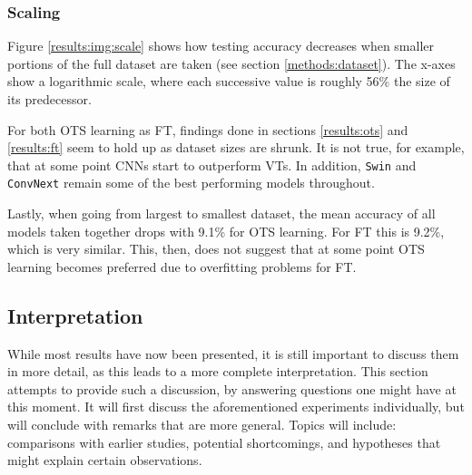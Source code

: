 \subsubsection{Scaling}

\begin{figure*}[tb]
    \centering
    \def\svgwidth{\textwidth}
    
    \caption{Testing accuracy as datasets gradually become smaller. The x-axes show a logarithmic scale, with the smallest value being roughly 10\% the size of largest one. Observations done in sections \ref{results:ots} and \ref{results:ft} appear to hold up well as the training set is shrunk.}
    \label{results:img:scale}
\end{figure*}

Figure \ref{results:img:scale} shows how testing accuracy decreases when smaller portions of the full dataset are taken (see section \ref{methods:dataset}). The x-axes show a logarithmic scale, where each successive value is roughly 56\% the size of its predecessor.

For both OTS learning as FT, findings done in sections \ref{results:ots} and \ref{results:ft} seem to hold up as dataset sizes are shrunk. It is not true, for example, that at some point CNNs start to outperform VTs. In addition, \texttt{Swin} and \texttt{ConvNext} remain some of the best performing models throughout. 

Lastly, when going from largest to smallest dataset, the mean accuracy of all models taken together drops with 9.1\% for OTS learning. For FT this is 9.2\%, which is very similar. This, then, does not suggest that at some point OTS learning becomes preferred due to overfitting problems for FT. %

\subsection{Interpretation} \label{exp:int} %
While most results have now been presented, it is still important to discuss them in more detail, as this leads to a more complete interpretation. This section attempts to provide such a discussion, by answering questions one might have at this moment. It will first discuss the aforementioned experiments individually, but will conclude with remarks that are more general. Topics will include: comparisons with earlier studies, potential shortcomings, and hypotheses that might explain certain observations.

